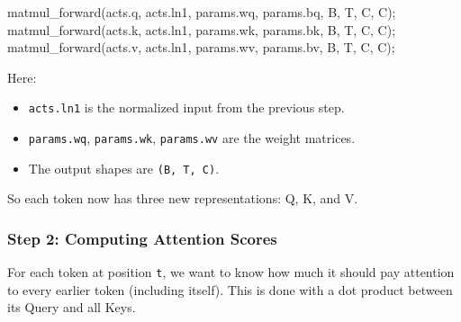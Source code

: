 \documentclass[
  letterpaper,
  DIV=11,
  numbers=noendperiod]{scrreprt}
\newenvironment{Shaded}{\begin{snugshade}}{\end{snugshade}}
\newcommand{\NormalTok}[1]{\textcolor[rgb]{0.00,0.23,0.31}{#1}}
\newcommand{\OperatorTok}[1]{\textcolor[rgb]{0.37,0.37,0.37}{#1}}
\providecommand{\tightlist}{%
  \setlength{\itemsep}{0pt}\setlength{\parskip}{0pt}}
\begin{document}
\begin{Shaded}
\begin{Highlighting}[]
\NormalTok{matmul\_forward}\OperatorTok{(}\NormalTok{acts}\OperatorTok{.}\NormalTok{q}\OperatorTok{,}\NormalTok{ acts}\OperatorTok{.}\NormalTok{ln1}\OperatorTok{,}\NormalTok{ params}\OperatorTok{.}\NormalTok{wq}\OperatorTok{,}\NormalTok{ params}\OperatorTok{.}\NormalTok{bq}\OperatorTok{,}\NormalTok{ B}\OperatorTok{,}\NormalTok{ T}\OperatorTok{,}\NormalTok{ C}\OperatorTok{,}\NormalTok{ C}\OperatorTok{);}
\NormalTok{matmul\_forward}\OperatorTok{(}\NormalTok{acts}\OperatorTok{.}\NormalTok{k}\OperatorTok{,}\NormalTok{ acts}\OperatorTok{.}\NormalTok{ln1}\OperatorTok{,}\NormalTok{ params}\OperatorTok{.}\NormalTok{wk}\OperatorTok{,}\NormalTok{ params}\OperatorTok{.}\NormalTok{bk}\OperatorTok{,}\NormalTok{ B}\OperatorTok{,}\NormalTok{ T}\OperatorTok{,}\NormalTok{ C}\OperatorTok{,}\NormalTok{ C}\OperatorTok{);}
\NormalTok{matmul\_forward}\OperatorTok{(}\NormalTok{acts}\OperatorTok{.}\NormalTok{v}\OperatorTok{,}\NormalTok{ acts}\OperatorTok{.}\NormalTok{ln1}\OperatorTok{,}\NormalTok{ params}\OperatorTok{.}\NormalTok{wv}\OperatorTok{,}\NormalTok{ params}\OperatorTok{.}\NormalTok{bv}\OperatorTok{,}\NormalTok{ B}\OperatorTok{,}\NormalTok{ T}\OperatorTok{,}\NormalTok{ C}\OperatorTok{,}\NormalTok{ C}\OperatorTok{);}
\end{Highlighting}
\end{Shaded}

Here:

\begin{itemize}
\tightlist
\item
  \texttt{acts.ln1} is the normalized input from the previous step.
\item
  \texttt{params.wq}, \texttt{params.wk}, \texttt{params.wv} are the
  weight matrices.
\item
  The output shapes are \texttt{(B,\ T,\ C)}.
\end{itemize}

So each token now has three new representations: Q, K, and V.

\subsubsection{Step 2: Computing Attention
Scores}\label{step-2-computing-attention-scores}

For each token at position \texttt{t}, we want to know how much it
should pay attention to every earlier token (including itself). This is
done with a dot product between its Query and all Keys.
\end{document}
